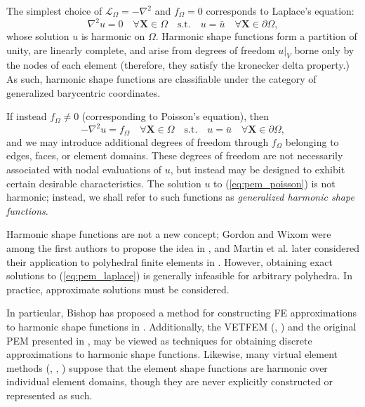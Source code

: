 	The simplest choice of $\mathcal{L}_{\Omega} = -\nabla^2$ and $f_{\Omega} = 0$ corresponds to Laplace's equation:
	\begin{equation}
		\nabla^2 u = 0 \quad \forall \mathbf{X} \in \Omega \quad \text{s.t.} \quad u = \bar{u} \quad \forall \mathbf{X} \in \partial \Omega,
		\label{eq:pem_laplace}
	\end{equation}
	whose solution $u$ is harmonic on $\Omega$. Harmonic shape functions form a partition of unity, are linearly complete, and arise from degrees of freedom $u|_V$ borne only by the nodes of each element (therefore, they satisfy the kronecker delta property.) As such, harmonic shape functions are classifiable under the category of generalized barycentric coordinates.
	
	If instead $f_{\Omega} \neq 0$ (corresponding to Poisson's equation), then
	\begin{equation}
		-\nabla^2 u = f_{\Omega} \quad \forall \mathbf{X} \in \Omega \quad \text{s.t.} \quad u = \bar{u} \quad \forall \mathbf{X} \in \partial \Omega,
		\label{eq:pem_poisson}
	\end{equation}
	and we may introduce additional degrees of freedom through $f_{\Omega}$ belonging to edges, faces, or element domains. These degrees of freedom are not necessarily associated with nodal evaluations of $u$, but instead may be designed to exhibit certain desirable characteristics. The solution $u$ to (\ref{eq:pem_poisson}) is not harmonic; instead, we shall refer to such functions as \textit{generalized harmonic shape functions}.
	
	Harmonic shape functions are not a new concept; Gordon and Wixom were among the first authors to propose the idea in \cite{Gordon:74}, and Martin et al. later considered their application to polyhedral finite elements in \cite{Martin:08}. However, obtaining exact solutions to (\ref{eq:pem_laplace}) is generally infeasible for arbitrary polyhedra. In practice, approximate solutions must be considered.
	
	In particular, Bishop has proposed a method for constructing FE approximations to harmonic shape functions in \cite{Bishop:14}. Additionally, the VETFEM (\cite{Rashid:00}, \cite{Rashid:06}) and the original PEM presented in \cite{Rashid:12}, may be viewed as techniques for obtaining discrete approximations to harmonic shape functions. Likewise, many virtual element methods (\cite{Chi:17}, \cite{Veiga:13}, \cite{Veiga:15}) suppose that the element shape functions are harmonic over individual element domains, though they are never explicitly constructed or represented as such.
	

